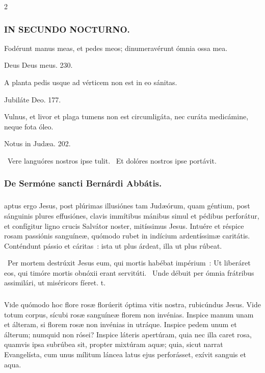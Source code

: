 \documentclass[9pt,twoside]{extarticle}
\begin{document}
\begin{multicols}{2}
\subsubsection*{\center \textsc{IN SECUNDO NOCTURNO.}}
\begin{tightlist}{}
\item {} Fodérunt manus meas, et pedes meos; dinumeravérunt ómnia ossa mea.
\item {} Deus Deus meus. 230.
\item {} A planta pedis usque ad vérticem non est in eo sánitas.
\item {} Jubiláte Deo. 177.
\item {} Vulnus, et livor et plaga tumens non est circumligáta, nec curáta medicámine, neque fota óleo.
\item {} Notus in Judæa. 202.
\item {}~Vere languóres nostros ipse tulit. ~Et dolóres nostros ipse portávit.
\end{tightlist}

\subsubsection*{\center De Sermóne sancti Bernárdi Abbátis.}
\subsubsection*{\center {}}
aptus ergo Jesus, post plúrimas illusiónes tam Judæórum, quam géntium, post sánguinis plures effusiónes, clavis immítibus mánibus simul et pédibus perforátur, et confígitur ligno crucis Salvátor noster, mitíssimus Jesus. Intuére et réspice rosam passiónis sanguíneæ, quómodo rubet in indícium ardentíssimæ caritátis. Conténdunt pássio et cáritas~: ista ut plus árdeat, illa ut plus rúbeat.

\begin{tightlist}{}
\item {}~Per mortem destrúxit Jesus eum, qui mortis habébat impérium~: \textred{*} Ut liberáret eos, qui timóre mortis obnóxii erant servitúti.  ~Unde débuit per ómnia frátribus assimilári, ut miséricors fíeret. t.
\end{tightlist}

\subsubsection*{\center {}}
\lettrine{V}ide quómodo hoc flore rosæ florúerit óptima vitis nostra, rubicúndus Jesus. Vide totum corpus, sícubi rosæ sanguíneæ florem non invénias. Inspice manum unam et álteram, si florem rosæ non invénias in utráque. Inspice pedem unum et álterum; numquid non rósei? Inspice láteris apertúram, quia nec illa caret rosa, quamvis ipsa subrúbea sit, propter mixtúram aquæ; quia, sicut narrat Evangelísta, cum unus mílitum láncea latus ejus perforásset, exívit sanguis et aqua.


\end{multicols}
\end{document}
